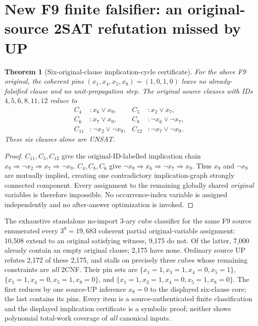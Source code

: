 \documentclass[11pt]{article}
\newtheorem{theorem}{Theorem}
\begin{document}
\section{New F9 finite falsifier: an original-source 2SAT refutation missed by UP}
\begin{theorem}[Six-original-clause implication-cycle certificate]
For the above F9 original, the coherent pins $(x_1,x_4,x_5,x_8)=(1,0,1,0)$ leave no already-falsified clause and no unit-propagation step. The original source clauses with IDs $4,5,6,8,11,12$ reduce to
\[
\begin{array}{rlrl}
C_4 &:x_6\vee x_9,& C_5 &:x_2\vee x_7,\\
C_6 &:x_7\vee x_9,& C_8 &:\neg x_6\vee\neg x_7,\\
C_{11}&:\neg x_2\vee\neg x_9,& C_{12}&:\neg x_7\vee\neg x_9.
\end{array}
\]
These six clauses alone are UNSAT.
\end{theorem}
\begin{proof}
$C_{11},C_5,C_{12}$ give the original-ID-labelled implication chain
$x_9\Rightarrow\neg x_2\Rightarrow x_7\Rightarrow\neg x_9$.
$C_4,C_8,C_6$ give
$\neg x_9\Rightarrow x_6\Rightarrow\neg x_7\Rightarrow x_9$.
Thus $x_9$ and $\neg x_9$ are mutually implied, creating one contradictory implication-graph strongly connected component. Every assignment to the remaining globally shared \emph{original} variables is therefore impossible. No occurrence-index variable is assigned independently and no after-answer optimization is invoked.
\end{proof}
The exhaustive standalone no-import 3-ary cube classifier for the same F9 source enumerated every $3^9=19{,}683$ coherent partial original-variable assignment: 10,508 extend to an original satisfying witness, 9,175 do not. Of the latter, 7,000 already contain an empty original clause; 2,175 have none. Ordinary source UP refutes 2,172 of these 2,175, and stalls on precisely three cubes whose remaining constraints are \emph{all} 2CNF. Their pin sets are $\{x_1=1,x_3=1,x_4=0,x_5=1\}$, $\{x_1=1,x_4=0,x_5=1,x_8=0\}$, and $\{x_1=1,x_3=1,x_4=0,x_5=1,x_8=0\}$. The first reduces by one source-UP inference $x_8=0$ to the displayed six-clause core; the last contains its pins. Every item is a source-authenticated finite classification and the displayed implication certificate is a symbolic proof; neither shows polynomial total-work coverage of \emph{all} canonical inputs.
\end{document}
